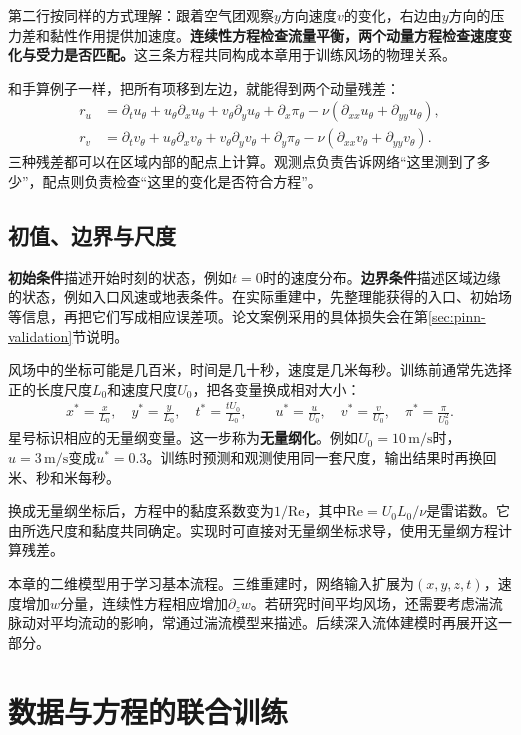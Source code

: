 第二行按同样的方式理解：跟着空气团观察$y$方向速度$v$的变化，右边由$y$方向的压力差和黏性作用提供加速度。\textbf{连续性方程检查流量平衡，两个动量方程检查速度变化与受力是否匹配。}这三条方程共同构成本章用于训练风场的物理关系。

和手算例子一样，把所有项移到左边，就能得到两个动量残差：
\begin{align}
 r_u&=\partial_tu_\theta+u_\theta\partial_xu_\theta
 +v_\theta\partial_yu_\theta+\partial_x\pi_\theta
 -\nu(\partial_{xx}u_\theta+\partial_{yy}u_\theta),\\
 r_v&=\partial_tv_\theta+u_\theta\partial_xv_\theta
 +v_\theta\partial_yv_\theta+\partial_y\pi_\theta
 -\nu(\partial_{xx}v_\theta+\partial_{yy}v_\theta).
 \label{eq:pinn-dimensional-residual}
\end{align}
三种残差都可以在区域内部的配点上计算。观测点负责告诉网络“这里测到了多少”，配点则负责检查“这里的变化是否符合方程”。

\subsection{初值、边界与尺度}
\textbf{初始条件}描述开始时刻的状态，例如$t=0$时的速度分布。\textbf{边界条件}描述区域边缘的状态，例如入口风速或地表条件。在实际重建中，先整理能获得的入口、初始场等信息，再把它们写成相应误差项。论文案例采用的具体损失会在第\ref{sec:pinn-validation}节说明。

风场中的坐标可能是几百米，时间是几十秒，速度是几米每秒。训练前通常先选择正的长度尺度$L_0$和速度尺度$U_0$，把各变量换成相对大小：
\begin{align}
 x^*=\frac{x}{L_0},\quad y^*=\frac{y}{L_0},\quad
 t^*=\frac{tU_0}{L_0},\qquad
 u^*=\frac{u}{U_0},\quad v^*=\frac{v}{U_0},\quad
 \pi^*=\frac{\pi}{U_0^2}.
 \label{eq:pinn-scales}
\end{align}
星号标识相应的无量纲变量。这一步称为\textbf{无量纲化}。例如$U_0=10\,\mathrm{m/s}$时，$u=3\,\mathrm{m/s}$变成$u^*=0.3$。训练时预测和观测使用同一套尺度，输出结果时再换回米、秒和米每秒。

换成无量纲坐标后，方程中的黏度系数变为$1/\mathrm{Re}$，其中$\mathrm{Re}=U_0L_0/\nu$是雷诺数。它由所选尺度和黏度共同确定。实现时可直接对无量纲坐标求导，使用无量纲方程计算残差。

本章的二维模型用于学习基本流程。三维重建时，网络输入扩展为$(x,y,z,t)$，速度增加$w$分量，连续性方程相应增加$\partial_zw$。若研究时间平均风场，还需要考虑湍流脉动对平均流动的影响，常通过湍流模型来描述。后续深入流体建模时再展开这一部分。

\section{数据与方程的联合训练}
\label{sec:pinn-training}

